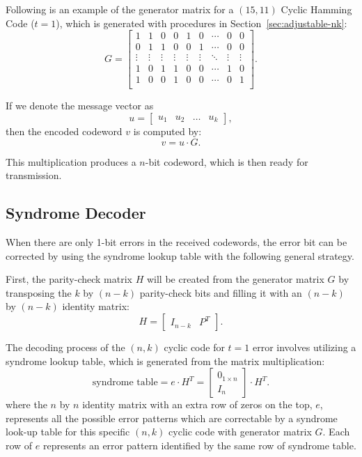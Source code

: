 \documentclass{article}
\begin{document}
Following is an example of the generator matrix for a $(15,11)$ Cyclic Hamming Code ($t=1$), which is generated with procedures in Section~\ref{sec:adjustable-nk}:
\begin{equation*}
    G = 
    \begin{bmatrix}
        1 & 1 & 0 & 0 & 1 & 0 & \cdots & 0 & 0 \\
        0 & 1 & 1 & 0 & 0 & 1 & \cdots & 0 & 0 \\
        \vdots & \vdots & \vdots & \vdots & \vdots & \vdots & \ddots & \vdots & \vdots \\
        1 & 0 & 1 & 1 & 0 & 0 & \cdots & 1 & 0 \\
        1 & 0 & 0 & 1 & 0 & 0 & \cdots & 0 & 1 \\
    \end{bmatrix} .
\end{equation*}

If we denote the message vector as 
\begin{equation*}
    u =
        \begin{bmatrix}
        u_1 & u_2 & \dots & u_k 
        \end{bmatrix},
\end{equation*}
then the encoded codeword $v$ is computed by:
\begin{equation*}
    v = u \cdot G .
\end{equation*}

This multiplication produces a $n$-bit codeword, which is then ready for transmission.


\subsection{Syndrome Decoder}
When there are only 1-bit errors in the received codewords, the error bit can be corrected by using the syndrome lookup table with the following general strategy. 

First, the parity-check matrix $H$ will be created from the generator matrix $G$ by transposing the $k$ by $(n-k)$ parity-check bits and filling it with an $(n-k)$ by $(n-k)$ identity matrix:
\begin{equation*}
    H = \begin{bmatrix}
        I_{n-k} & P^T
    \end{bmatrix} .
\end{equation*}

The decoding process of the $(n, k)$ cyclic code for $t=1$ error involves utilizing a syndrome lookup table, which is generated from the matrix multiplication:
\begin{equation*}
\text{syndrome table} = e \cdot H^T = \begin{bmatrix}
0_{1\times n} \\
I_n
\end{bmatrix} \cdot H^T .
\end{equation*}
where the $n$ by $n$ identity matrix with an extra row of zeros on the top, $e$, represents all the possible error patterns which are correctable by a syndrome look-up table for this specific $(n, k)$ cyclic code with generator matrix $G$. Each row of $e$ represents an error pattern identified by the same row of syndrome table. 
\end{document}
